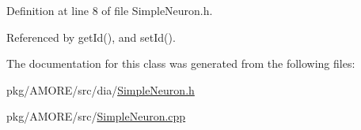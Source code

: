 Definition at line 8 of file SimpleNeuron.h.



Referenced by getId(), and setId().



The documentation for this class was generated from the following files:\begin{DoxyCompactItemize}
\item 
pkg/AMORE/src/dia/\hyperlink{_simple_neuron_8h}{SimpleNeuron.h}\item 
pkg/AMORE/src/\hyperlink{_simple_neuron_8cpp}{SimpleNeuron.cpp}\end{DoxyCompactItemize}
